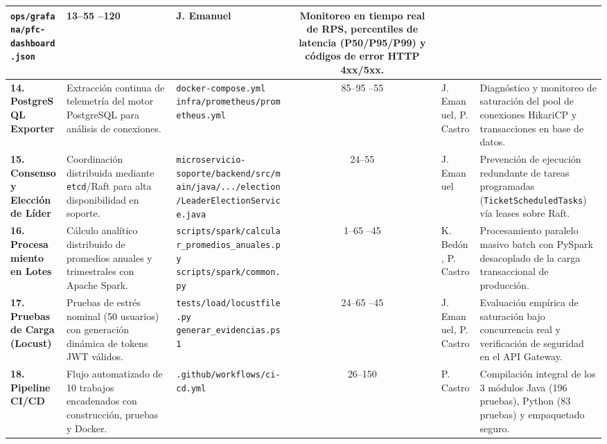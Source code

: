 \documentclass[11pt,a4paper]{article}
\begin{document}
\begin{table}[H]
\begin{tabularx}{\textwidth}{|p{2.2cm}|p{2.5cm}|p{4.8cm}|c|p{1.4cm}|X|}
\texttt{ops/grafana/pfc-dashboard.json} &
13--55 \newline
1--120 &
J. Emanuel &
Monitoreo en tiempo real de RPS, percentiles de latencia (P50/P95/P99) y c\'odigos de error HTTP 4xx/5xx. \\
\hline
\textbf{14. PostgreSQL Exporter} &
Extracci\'on continua de telemetr\'ia del motor PostgreSQL para an\'alisis de conexiones. &
\texttt{docker-compose.yml} \newline
\texttt{infra/prometheus/prometheus.yml} &
85--95 \newline
45--55 &
J. Emanuel, \newline P. Castro &
Diagn\'ostico y monitoreo de saturaci\'on del pool de conexiones HikariCP y transacciones en base de datos. \\
\hline
\textbf{15. Consenso y Elecci\'on de L\'ider} &
Coordinaci\'on distribuida mediante \texttt{etcd}/Raft para alta disponibilidad en soporte. &
\texttt{microservicio-soporte/backend/}\allowbreak\texttt{src/main/java/.../election/}\allowbreak\texttt{LeaderElectionService.java} &
24--55 &
J. Emanuel &
Prevenci\'on de ejecuci\'on redundante de tareas programadas (\texttt{TicketScheduledTasks}) v\'ia leases sobre Raft. \\
\hline
\textbf{16. Procesamiento en Lotes} &
C\'alculo anal\'itico distribuido de promedios anuales y trimestrales con Apache Spark. &
\texttt{scripts/spark/}\allowbreak\texttt{calcular\_promedios\_anuales.py} \newline
\texttt{scripts/spark/common.py} &
1--65 \newline
1--45 &
K. Bed\'on, \newline P. Castro &
Procesamiento paralelo masivo batch con PySpark desacoplado de la carga transaccional de producci\'on. \\
\hline
\textbf{17. Pruebas de Carga (Locust)} &
Pruebas de estr\'es nominal (50 usuarios) con generaci\'on din\'amica de tokens JWT v\'alidos. &
\texttt{tests/load/locustfile.py} \newline
\texttt{generar\_evidencias.ps1} &
24--65 \newline
1--45 &
J. Emanuel, \newline P. Castro &
Evaluaci\'on emp\'irica de saturaci\'on bajo concurrencia real y verificaci\'on de seguridad en el API Gateway. \\
\hline
\textbf{18. Pipeline CI/CD} &
Flujo automatizado de 10 trabajos encadenados con construcci\'on, pruebas y Docker. &
\texttt{.github/workflows/ci-cd.yml} &
26--150 &
P. Castro &
Compilaci\'on integral de los 3 m\'odulos Java (196 pruebas), Python (83 pruebas) y empaquetado seguro. \\
\hline
\end{tabularx}
\end{table}
\clearpage
\end{document}
